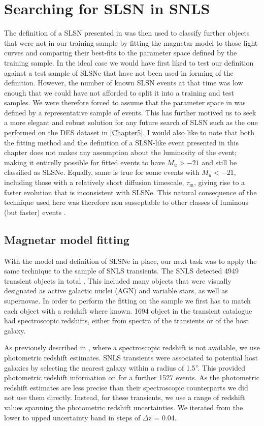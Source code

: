 \section{Searching for SLSN in SNLS}
The definition of a SLSN presented in  was then used to classify further objects that were not in our training sample by fitting the magnetar model to those light curves and comparing their best-fits to the parameter space defined by the training sample. In the ideal case we would have first liked to test our definition against a test sample of SLSNe that have not been used in forming of the definition. However, the number of known SLSN events at that time was low enough that we could have not afforded to split it into a training and test samples. We were therefore forced to assume that the parameter space in  was defined by a representative sample of events. This has further motived us to seek a more elegant and robust solution for any future search of SLSN such as the one performed on the DES dataset in \cref{Chapter5}. I would also like to note that both the fitting method and the definition of a SLSN-like event presented in this chapter does not makes any assumption about the luminosity of the event; making it entirelly possible for fitted events to have $M_u>-21$ and still be classified as SLSNe. Equally, same is true for some events with $M_u<-21$, including those with a relatively short diffusion timescale, $\tau_\mathrm{m}$, giving rise to a faster evolution that is inconsistent with SLSNe. This natural consequence of the technique used here was therefore non susseptable to other classes of luminous (but faster) events \citep{Arcavi15}.

\subsection{Magnetar model fitting}
With the model and definition of SLSNe in place, our next task was to apply the same technique to the sample of SNLS transients. The SNLS detected 4949 transient objects in total \citep{Perrett2010}. This included many objects that were visually designated as active galactic nuclei (AGN) and variable stars, as well as supernovae. In order to perform the fitting on the sample we first has to match each object with a redshift where known. 1694 object in the transient catalogue had spectroscopic redshifts, either from spectra of the transients or of the host galaxy.


As previously described in , where a spectroscopic redshift is not available, we use photometric redshift estimates. SNLS transients were associated to potential host galaxies by selecting the nearest galaxy within a radius of 1.5''. This provided photometric redshift information on for a further 1527 events. As the photometric redshift estimates are less precise than their spectroscopic counterparts we did not use them directly. Instead, for these transients, we use a range of redshift values spanning the photometric redshift uncertainties. We iterated from the lower to upped uncertainty band in steps of $\Delta$z = 0.04.

